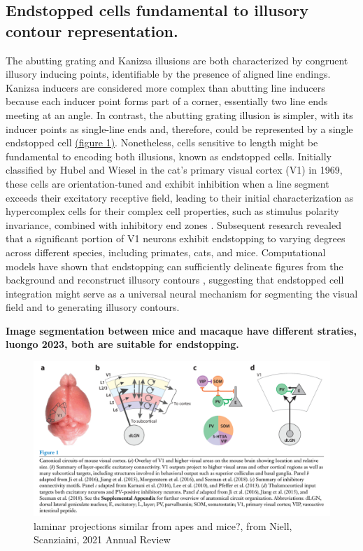 \documentclass[12pt]{article}
\begin{document}
\bigbreak
\subsection{Endstopped cells fundamental to illusory contour representation.}
The abutting grating and Kanizsa illusions are both characterized by congruent illusory inducing points, identifiable by the presence of aligned line endings. Kanizsa inducers are considered more complex than abutting line inducers because each inducer point forms part of a corner, essentially two line ends meeting at an angle. In contrast, the abutting grating illusion is simpler, with its inducer points as single-line ends and, therefore, could be represented by a single endstopped cell \hyperref[fig:figure_1]{(figure 1)}.
Nonetheless, cells sensitive to length might be fundamental to encoding both illusions, known as endstopped cells. Initially classified by Hubel and Wiesel in the cat's primary visual cortex (V1) in 1969, these cells are orientation-tuned and exhibit inhibition when a line segment exceeds their excitatory receptive field, leading to their initial characterization as hypercomplex cells for their complex cell properties, such as stimulus polarity invariance, combined with inhibitory end zones \autocite{hubelRECEPTIVEFIELDSFUNCTIONAL1965}. Subsequent research revealed that a significant portion of V1 neurons exhibit endstopping to varying degrees  \autocite{deangelisLengthWidthTuning1994,jonesSurroundSuppressionPrimate2001,sceniakVisualSpatialCharacterization2001} across different species, including primates, cats, and mice. Computational models have shown that endstopping can sufficiently delineate figures from the background and reconstruct illusory contours \autocite{vonderheydtMechanismsContourPerception1989}, suggesting that endstopped cell integration might serve as a universal neural mechanism for segmenting the visual field and to generating illusory contours.

\textbf{Image segmentation between mice and macaque have different straties, luongo 2023, both are suitable for endstopping.}

\begin{figure}
  \centering
  \includegraphics[width=1.0 \textwidth]{figures/Canonical_laminar_projection.png}
  \caption{laminar projections similar from apes and mice?, from Niell, Scanziaini, 2021 Annual Review}
  \label{fig:figure 3}
\end{figure}
\end{document}
